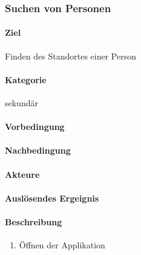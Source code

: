 \subsubsection{Suchen von Personen}
\paragraph{Ziel}
Finden des Standortes einer Person
\paragraph{Kategorie}
sekundär
\paragraph{Vorbedingung}

\paragraph{Nachbedingung}

\paragraph{Akteure}

\paragraph{Auslösendes Ergeignis}

\paragraph{Beschreibung}
\begin{enumerate}
    \item Öffnen der Applikation
\end{enumerate}